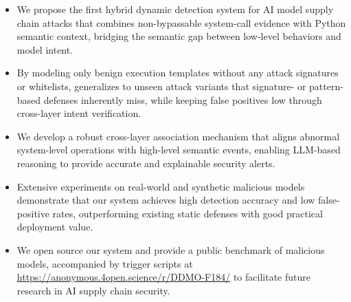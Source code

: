 \begin{itemize}
\item We propose the first hybrid dynamic detection system for AI model supply chain attacks that combines non-bypassable system-call evidence with Python semantic context, bridging the semantic gap between low-level behaviors and model intent.
\item By modeling only benign execution templates without any attack signatures or whitelists, \toolname{} generalizes to unseen attack variants that signature- or pattern-based defenses inherently miss, while keeping false positives low through cross-layer intent verification.
\item We develop a robust cross-layer association mechanism that aligns abnormal system-level operations with high-level semantic events, enabling LLM-based reasoning to provide accurate and explainable security alerts.
\item Extensive experiments on real-world and synthetic malicious models demonstrate that our system achieves high detection accuracy and low false-positive rates, outperforming existing static defenses with good practical deployment value.
\item We open source our system and provide a public benchmark of malicious models, accompanied by trigger scripts at \url{https://anonymous.4open.science/r/DDMO-F184/} to facilitate future research in AI supply chain security.
\end{itemize}

